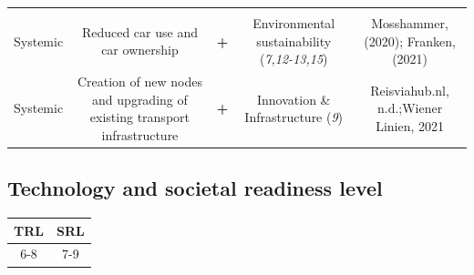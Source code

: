 \documentclass[
]{book}
\begin{document}
\begin{longtable}[]{@{}ccccc@{}}
\begin{minipage}[t]{0.17\columnwidth}
\end{minipage}\tabularnewline
\begin{minipage}[t]{0.17\columnwidth}\centering
Systemic\strut
\end{minipage} & \begin{minipage}[t]{0.16\columnwidth}\centering
Reduced car use and car ownership\strut
\end{minipage} & \begin{minipage}[t]{0.17\columnwidth}\centering
\textbf{+}\strut
\end{minipage} & \begin{minipage}[t]{0.17\columnwidth}\centering
Environmental sustainability (\emph{7,12-13,15})\strut
\end{minipage} & \begin{minipage}[t]{0.17\columnwidth}\centering
Mosshammer, (2020); Franken, (2021)\strut
\end{minipage}\tabularnewline
\begin{minipage}[t]{0.17\columnwidth}\centering
Systemic\strut
\end{minipage} & \begin{minipage}[t]{0.16\columnwidth}\centering
Creation of new nodes and upgrading of existing transport infrastructure\strut
\end{minipage} & \begin{minipage}[t]{0.17\columnwidth}\centering
\textbf{+}\strut
\end{minipage} & \begin{minipage}[t]{0.17\columnwidth}\centering
Innovation \& Infrastructure (\emph{9})\strut
\end{minipage} & \begin{minipage}[t]{0.17\columnwidth}\centering
Reisviahub.nl, n.d.;Wiener Linien, 2021\strut
\end{minipage}\tabularnewline
\bottomrule
\end{longtable}

\hypertarget{technology-and-societal-readiness-level-20}{%
\subsection*{Technology and societal readiness level}\label{technology-and-societal-readiness-level-20}}

\begin{longtable}[]{@{}cc@{}}
\toprule
TRL & SRL\tabularnewline
\midrule
\endhead
6-8 & 7-9\tabularnewline
\bottomrule
\end{longtable}
\end{document}
